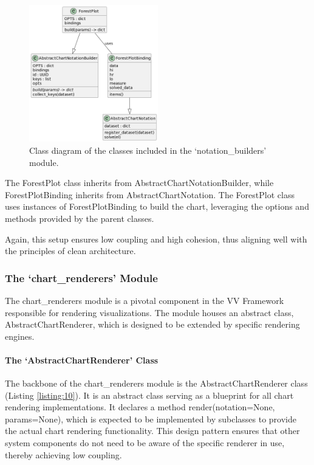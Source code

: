 \begin{figure}[!ht]
  \centering
  \includegraphics[width=0.5\textwidth]{media/fig12.png}
  \caption{Class diagram of the classes included in the
  `notation\_builders' module.}
  \label{fig:class_diag2}
\end{figure}

The ForestPlot class inherits from AbstractChartNotationBuilder, while
ForestPlotBinding inherits from AbstractChartNotation. The ForestPlot
class uses instances of ForestPlotBinding to build the chart, leveraging
the options and methods provided by the parent classes.

Again, this setup ensures low coupling and high cohesion, thus aligning
well with the principles of clean architecture.

\subsubsection{The `chart\_renderers'
Module}\label{the-chart_renderers-module}

The chart\_renderers module is a pivotal component in the VV Framework
responsible for rendering visualizations. The module houses an abstract
class, AbstractChartRenderer, which is designed to be extended by
specific rendering engines.

\paragraph{The `AbstractChartRenderer'
Class}\label{the-abstractchartrenderer-class}

The backbone of the chart\_renderers module is the AbstractChartRenderer
class (Listing \ref{listing:10}). It is an abstract class serving as a blueprint for
all chart rendering implementations. It declares a method
render(notation=None, params=None), which is expected to be implemented
by subclasses to provide the actual chart rendering functionality. This
design pattern ensures that other system components do not need to be
aware of the specific renderer in use, thereby achieving low coupling.

